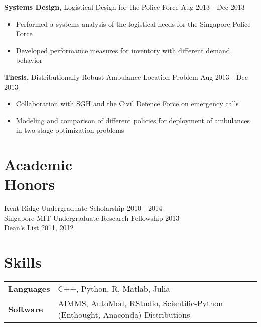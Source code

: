 \documentclass[margin]{res}
\begin{document}
\begin{resume}
{\bf Systems Design,} Logistical Design for the Police Force \hfill Aug 2013 - Dec 2013
\begin{itemize} \itemsep -2pt
\item Performed a systems analysis of the logistical needs for the Singapore Police Force
\item Developed performance measures for inventory with different demand behavior
\end{itemize}

{\bf Thesis,} Distributionally Robust Ambulance Location Problem \hfill Aug 2013 - Dec 2013
\begin{itemize} \itemsep -2pt
\item Collaboration with SGH and the Civil Defence Force on emergency calls
\item Modeling and comparison of different policies for deployment of ambulances in two-stage optimization problems
\end{itemize}

\section{Academic \\ Honors}
Kent Ridge Undergraduate Scholarship \hfill 2010 - 2014 \\
Singapore-MIT Undergraduate Research Fellowship \hfill 2013 \\
Dean's List \hfill 2011, 2012

\section{Skills}
\begin{tabular}{l p{3in}}
\bf{Languages} & C++, Python, R, Matlab, Julia \\
\bf{Software} & AIMMS, AutoMod, RStudio, Scientific-Python (Enthought, Anaconda) Distributions
\end{tabular}

\end{resume} 
\end{document}
